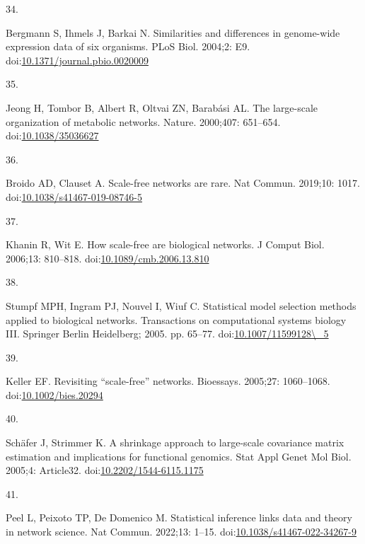 \documentclass[
]{article}
\newlength{\cslhangindent}
\newlength{\csllabelwidth}
\newenvironment{CSLReferences}[2] %
 {\begin{list}{}{%
  \setlength{\itemindent}{0pt}
  \setlength{\leftmargin}{0pt}
  \setlength{\parsep}{0pt}
  \ifodd #1
   \setlength{\leftmargin}{\cslhangindent}
   \setlength{\itemindent}{-1\cslhangindent}
  \fi
  \setlength{\itemsep}{#2\baselineskip}}}
 {\end{list}}
\newcommand{\CSLLeftMargin}[1]{\parbox[t]{\csllabelwidth}{\strut#1\strut}}
\newcommand{\CSLRightInline}[1]{\parbox[t]{\linewidth - \csllabelwidth}{\strut#1\strut}}
\begin{document}
\begin{CSLReferences}{0}{1}
\CSLLeftMargin{34. }%
\CSLRightInline{Bergmann S, Ihmels J, Barkai N. Similarities and
differences in genome-wide expression data of six organisms. PLoS Biol.
2004;2: E9.
doi:\href{https://doi.org/10.1371/journal.pbio.0020009}{10.1371/journal.pbio.0020009}}

\CSLLeftMargin{35. }%
\CSLRightInline{Jeong H, Tombor B, Albert R, Oltvai ZN, Barabási AL. The
large-scale organization of metabolic networks. Nature. 2000;407:
651--654. doi:\href{https://doi.org/10.1038/35036627}{10.1038/35036627}}

\CSLLeftMargin{36. }%
\CSLRightInline{Broido AD, Clauset A. Scale-free networks are rare. Nat
Commun. 2019;10: 1017.
doi:\href{https://doi.org/10.1038/s41467-019-08746-5}{10.1038/s41467-019-08746-5}}

\CSLLeftMargin{37. }%
\CSLRightInline{Khanin R, Wit E. How scale-free are biological networks.
J Comput Biol. 2006;13: 810--818.
doi:\href{https://doi.org/10.1089/cmb.2006.13.810}{10.1089/cmb.2006.13.810}}

\CSLLeftMargin{38. }%
\CSLRightInline{Stumpf MPH, Ingram PJ, Nouvel I, Wiuf C. Statistical
model selection methods applied to biological networks. Transactions on
computational systems biology {III}. Springer Berlin Heidelberg; 2005.
pp. 65--77.
doi:\href{https://doi.org/10.1007/11599128/_5}{10.1007/11599128\textbackslash\_5}}

\CSLLeftMargin{39. }%
\CSLRightInline{Keller EF. Revisiting {``scale-free''} networks.
Bioessays. 2005;27: 1060--1068.
doi:\href{https://doi.org/10.1002/bies.20294}{10.1002/bies.20294}}

\CSLLeftMargin{40. }%
\CSLRightInline{Schäfer J, Strimmer K. A shrinkage approach to
large-scale covariance matrix estimation and implications for functional
genomics. Stat Appl Genet Mol Biol. 2005;4: Article32.
doi:\href{https://doi.org/10.2202/1544-6115.1175}{10.2202/1544-6115.1175}}

\CSLLeftMargin{41. }%
\CSLRightInline{Peel L, Peixoto TP, De Domenico M. Statistical inference
links data and theory in network science. Nat Commun. 2022;13: 1--15.
doi:\href{https://doi.org/10.1038/s41467-022-34267-9}{10.1038/s41467-022-34267-9}}


\end{CSLReferences}
\end{document}
